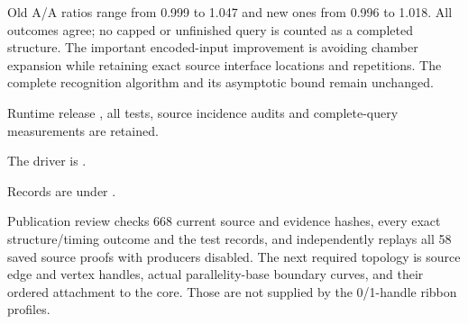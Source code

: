 Old A/A ratios range from 0.999 to 1.047 and new ones from 0.996 to 1.018.
All outcomes agree; no capped or unfinished query is counted as a completed
structure. The important encoded-input improvement is avoiding chamber
expansion while retaining exact source interface locations and repetitions.
The complete recognition algorithm and its asymptotic bound remain unchanged.

Runtime release , all tests, source incidence audits and
complete-query measurements are retained.

The driver is .

Records are under .

Publication review checks 668 current source and evidence hashes, every exact structure/timing outcome and the test
records, and independently replays all 58 saved source proofs with producers
disabled. The next required topology is source edge and vertex handles,
actual parallelity-base boundary curves, and their ordered attachment to the
core. Those are not supplied by the 0/1-handle ribbon profiles.
